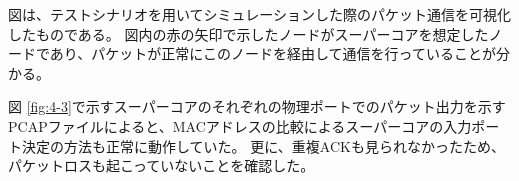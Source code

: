 

図は、テストシナリオを用いてシミュレーションした際のパケット通信を可視化したものである。
図内の赤の矢印で示したノードがスーパーコアを想定したノードであり、パケットが正常にこのノードを経由して通信を行っていることが分かる。

\begin{comment}
\begin{figure}[tb]
\begin{center}
\begin{tabular}{c}

\begin{minipage}{0.4\hsize}
\begin{center}
\texttt{[image: ./lena.eps]}
\hspace{1.6cm} [1]通常画像
\end{center}
\end{minipage}

\begin{minipage}{0.4\hsize}
\begin{center}
\texttt{[image: ./lena-affine.eps]}
\hspace{1.6cm} [2]アフィン変換(90度回転)
\end{center}
\end{minipage}

\end{tabular}
\caption{画像の変換例}
\label{fig:4-3}
\end{center}
\end{figure}
\end{comment}

図 \ref{fig:4-3}で示すスーパーコアのそれぞれの物理ポートでのパケット出力を示すPCAPファイルによると、MACアドレスの比較によるスーパーコアの入力ポート決定の方法も正常に動作していた。
更に、重複ACKも見られなかったため、パケットロスも起こっていないことを確認した。

